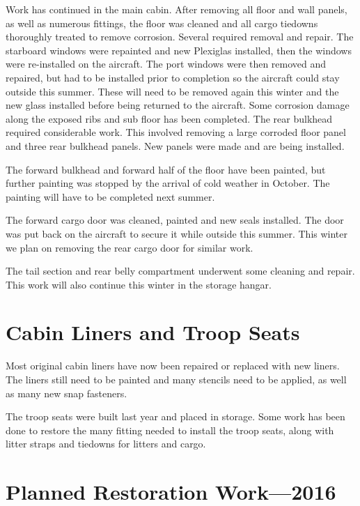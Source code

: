 Work has continued in the main cabin.  After removing all floor and
wall panels, as well as numerous fittings, the floor was cleaned and
all cargo tiedowns thoroughly treated to remove corrosion.  Several
required removal and repair. The starboard windows were repainted and
new Plexiglas installed, then the windows were re-installed on the
aircraft.  The port windows were then removed and repaired, but had to
be installed prior to completion so the aircraft could stay outside
this summer.  These will need to be removed again this winter and the
new glass installed before being returned to the aircraft.  Some
corrosion damage along the exposed ribs and sub floor has been
completed.  The rear bulkhead required considerable work.  This
involved removing a large corroded floor panel and three rear bulkhead
panels.  New panels were made and are being installed.

The forward bulkhead and forward half of the floor have been painted,
but further painting was stopped by the arrival of cold weather in
October.  The painting will have to be completed next summer.

The forward cargo door was cleaned, painted and new seals installed.
The door was put back on the aircraft to secure it while outside this
summer.  This winter we plan on removing the rear cargo door for
similar work.

The tail section and rear belly compartment underwent some cleaning
and repair.  This work will also continue this winter in the storage
hangar.

\section{Cabin Liners and Troop Seats}
\label{sec:liners_troop_seats}

Most original cabin liners have now been repaired or replaced with new
liners.  The liners still need to be painted and many stencils need to
be applied, as well as many new snap fasteners.  

The troop seats were built last year and placed in storage.  Some work
has been done to restore the many fitting needed to install the troop
seats, along with litter straps and tiedowns for litters and cargo.

\section{Planned Restoration Work---2016}
\label{sec:plannedwork}

